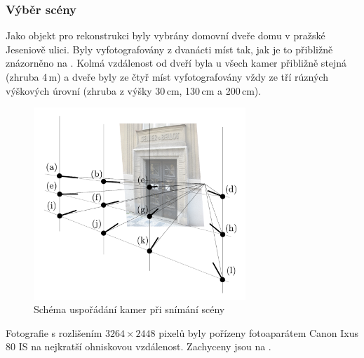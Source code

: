 \documentclass[11pt,oneside,a4paper,pdftex]{article}   %
\begin{document}
\subsubsection{Výběr scény}
Jako objekt pro rekonstrukci byly vybrány domovní dveře domu v pražské Jeseniově ulici. Byly
vyfotografovány z dvanácti míst tak, jak je to přibližně znázorněno na .
Kolmá vzdálenost od dveří byla u všech kamer přibližně stejná (zhruba 4\,m) a dveře byly ze čtyř
míst vyfotografovány vždy ze tří rúzných výškových úrovní (zhruba z výšky 30\,cm, 130\,cm a
200\,cm).
	\begin{figure}[htb]
		\centering
		\includegraphics[width=8cm]{pictures/usporadani_kamer.pdf}
		\caption{Schéma uspořádání kamer při snímání scény}
		\label{fig:usporadaniKamer}
	\end{figure}
Fotografie s rozlišením $3264\times2448$ pixelů byly pořízeny fotoaparátem Canon Ixus 80
IS na nejkratší ohniskovou vzdálenost. Zachyceny jsou na .
\end{document}
